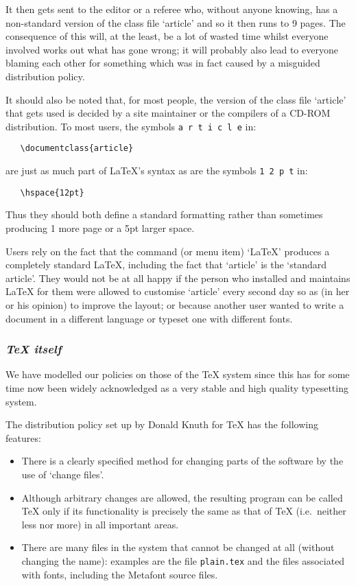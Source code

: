 \documentclass{ltxguide}[1995/11/28]
\newcommand{\reasonsection}[1]{\subsubsection*{\it #1}}
\begin{document}
It then gets sent to the editor or a referee who, without anyone
knowing, has a non-standard version of the class file `article' and so
it then runs to 9 pages.  The consequence of this will, at the least,
be a lot of wasted time whilst everyone involved works out what has
gone wrong; it will probably also lead to everyone blaming each other
for something which was in fact caused by a misguided distribution
policy.

It should also be noted that, for most people, the version of the
class file `article' that gets used is decided by a site maintainer
or the compilers of a CD-ROM distribution.  To most users,
the symbols \texttt{a\,r\,t\,i\,c\,l\,e} in:
\begin{verbatim}
   \documentclass{article}
\end{verbatim}
are just as much part of \LaTeX{}'s syntax as are the symbols
\texttt{1\,2\,p\,t} in:
\begin{verbatim}
   \hspace{12pt}
\end{verbatim}
Thus they should both define a standard formatting rather than
sometimes producing 1 more page or a 5pt larger space.

Users rely on the fact that the command (or menu item) `LaTeX'
produces a completely standard \LaTeX, including the fact that
`article' is the `standard article'.  They would not be at all happy
if the person who installed and maintains \LaTeX{} for them were
allowed to customise `article' every second day so as (in her or his
opinion) to improve the layout; or because another user wanted to write
a document in a different language or typeset one with different fonts.

\reasonsection{\TeX{} itself}
\label{sec:tex}

We have modelled our policies on those of the \TeX{} system since this
has for some time now been widely acknowledged as a very stable and
high quality typesetting system.

The distribution policy set up by Donald Knuth for \TeX{} has the
following features:
\begin{itemize}
\item There is a clearly specified method for changing parts of the
  software by the use of `change files'.
\item Although arbitrary changes are allowed, the resulting program
  can be called \TeX{} only if its functionality is precisely the same
  as that of \TeX{} (i.e.~neither less nor more) in all important
  areas.
\item There are many files in the system that cannot be changed at all
  (without changing the name): examples are the file
  \texttt{plain.tex} and the files associated with fonts, including
  the Metafont source files.
\end{itemize}
\end{document}
